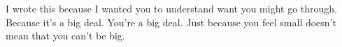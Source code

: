 I wrote this because I wanted you to understand want you might go through. Because it's a big deal. You're a big deal. Just because you feel small doesn't mean that you can't be big.